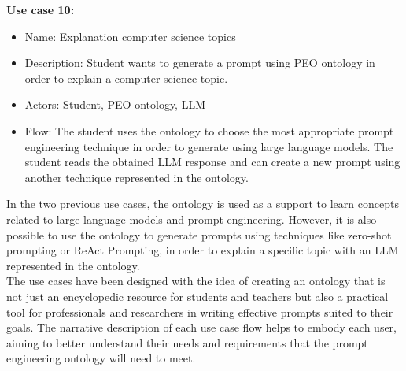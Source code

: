 \textbf{Use case 10:}
\begin{itemize}
    \item Name: Explanation computer science topics
    \item Description: Student wants to generate a prompt using PEO ontology in order to explain a computer science topic.
    \item Actors: Student, PEO ontology, LLM
    \item Flow: The student uses the ontology to choose the most appropriate prompt engineering technique in order to generate using large language models. The student reads the obtained LLM response and can create a new prompt using another technique represented in the ontology.
\end{itemize}
In the two previous use cases, the ontology is used as a support to learn concepts related to large language models and prompt engineering. However, it is also possible to use the ontology to generate prompts using techniques like zero-shot prompting or ReAct Prompting, in order to explain a specific topic with an LLM represented in the ontology.\\
The use cases have been designed with the idea of creating an ontology that is not just an encyclopedic resource for students and teachers but also a practical tool for professionals and researchers in writing effective prompts suited to their goals. The narrative description of each use case flow helps to embody each user, aiming to better understand their needs and requirements that the prompt engineering ontology will need to meet.

